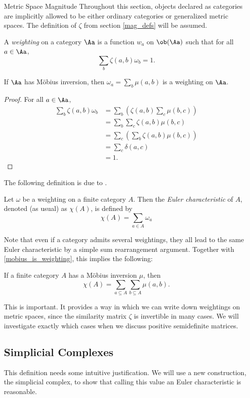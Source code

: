 \documentclass[12pt]{pom_thesis}
\begin{document}
\begin{chapter}{Metric Space Magnitude}
Throughout this section, objects declared as categories are implicitly allowed to be either ordinary categories or generalized metric spaces. The definition of $\zeta$ from section \ref{mag_defs} will be assumed.

\begin{defn}
A \emph{weighting} on a category $\Aa$ is a function $w_a$ on $\ob(\Aa)$ such that for all $a \in \Aa$,
\[
\sum_b \zeta(a,b)\omega_b = 1.
\]
\end{defn}
\begin{lemma}
\label{mobius_is_weighting}
If $\Aa$ has M\"obius inversion, then $\omega_a = \sum_b \mu(a,b)$ is a weighting on $\Aa$.
\end{lemma}
\begin{proof} For all $a \in \Aa$,
\begin{align*}
\sum_b \zeta(a,b)\omega_b &= \sum_b\left( \zeta(a,b)\sum_c \mu(b,c)\right)\\
&=\sum_b\sum_c\zeta(a,b)\mu(b,c)\\
&=\sum_c\left(\sum_b\zeta(a,b)\mu(b,c)\right)\\
&=\sum_c \delta(a,c)\\
&=1.
\end{align*}
\end{proof}

The following definition is due to \cite{Lein1}.
\begin{defn}
Let $\omega$ be a weighting on a finite category $A$. Then the \emph{Euler characteristic} of $A$, denoted (as usual) as $\chi(A)$, is defined by
\[
\chi(A) = \sum_{a \in A} \omega_a
\]
\end{defn}
Note that even if a category admits several weightings, they all lead to the same Euler characteristic by a simple sum rearrangement argument. Together with \ref{mobius_is_weighting}, this implies the following:
\begin{cor}
If a finite category $A$ has a M\"obius inversion $\mu$, then
\[\chi(A) = \sum_{a \subseteq A} \sum_{b \subseteq A} \mu(a, b).
\]
\end{cor}
This is important. It provides a way in which we can write down weightings on metric spaces, since the similarity matrix $\zeta$ is invertible in many cases. We will investigate exactly which cases when we discuss positive semidefinite matrices.
\subsection{Simplicial Complexes}
This definition needs some intuitive justification. We will use a new construction, the simplicial complex, to show that calling this value an Euler characteristic is reasonable. 


\end{chapter}
\end{document}
